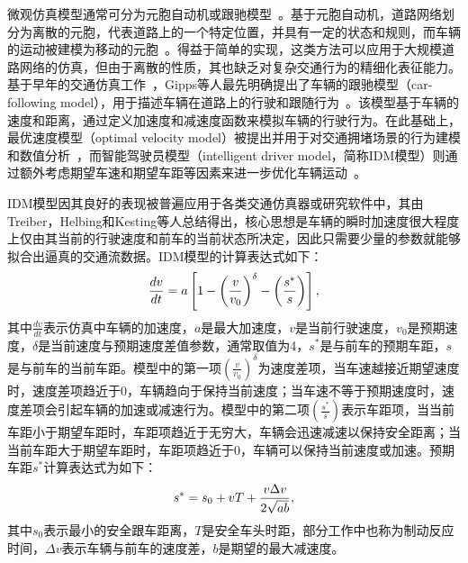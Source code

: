 微观仿真模型通常可分为元胞自动机或跟驰模型~\cite{saifuzzaman2014incorporating, wang2017survey, chao2020survey}。基于元胞自动机，道路网络划分为离散的元胞，代表道路上的一个特定位置，并具有一定的状态和规则，而车辆的运动被建模为移动的元胞~\cite{nagel1992cellular, knospe2004empirical}。得益于简单的实现，这类方法可以应用于大规模道路网络的仿真，但由于离散的性质，其也缺乏对复杂交通行为的精细化表征能力。基于早年的交通仿真工作~\cite{pipes1953operational, herman1963vehicular}，Gipps等人最先明确提出了车辆的跟驰模型（car-following model），用于描述车辆在道路上的行驶和跟随行为~\cite{gipps1981behavioural}。该模型基于车辆的速度和距离，通过定义加速度和减速度函数来模拟车辆的行驶行为。在此基础上，最优速度模型（optimal velocity model）被提出并用于对交通拥堵场景的行为建模和数值分析~\cite{bando1995dynamical}，而智能驾驶员模型（intelligent driver model，简称IDM模型）则通过额外考虑期望车速和期望车距等因素来进一步优化车辆运动~\cite{treiber2000congested-idm}。

IDM模型因其良好的表现被普遍应用于各类交通仿真器或研究软件中，其由Treiber，Helbing和Kesting等人总结得出，核心思想是车辆的瞬时加速度很大程度上仅由其当前的行驶速度和前车的当前状态所决定，因此只需要少量的参数就能够拟合出逼真的交通流数据。IDM模型的计算表达式如下：
\begin{equation}
\setlength\abovedisplayskip{10pt}
\setlength\belowdisplayskip{10pt}
\label{eq:intro_idm}
    \frac{dv}{dt} = a \left[ 1 - \left(\frac{v}{v_0} \right)^\delta - \left( \frac{s^*}{s} \right) \right],
\end{equation}
其中$\frac{dv}{dt}$表示仿真中车辆的加速度，$a$是最大加速度，$v$是当前行驶速度，$v_0$是预期速度，$\delta$是当前速度与预期速度差值参数，通常取值为4，$s^*$是与前车的预期车距，$s$是与前车的当前车距。模型中的第一项$\left(\frac{v}{v_0} \right)^\delta$为速度差项，当车速越接近期望速度时，速度差项趋近于0，车辆趋向于保持当前速度；当车速不等于预期速度时，速度差项会引起车辆的加速或减速行为。模型中的第二项$\left( \frac{s^*}{s} \right)$表示车距项，当当前车距小于期望车距时，车距项趋近于无穷大，车辆会迅速减速以保持安全距离；当当前车距大于期望车距时，车距项趋近于0，车辆可以保持当前速度或加速。预期车距$s^*$计算表达式为如下：
\begin{equation}
\setlength\abovedisplayskip{10pt}
\setlength\belowdisplayskip{10pt}
\label{eq:intro_idm2}
    s^* = s_0 + vT + \frac{v\Delta{v}}{2\sqrt{ab}},
\end{equation}
其中$s_0$表示最小的安全跟车距离，$T$是安全车头时距，部分工作中也称为制动反应时间，$\Delta{v}$表示车辆与前车的速度差，$b$是期望的最大减速度。


